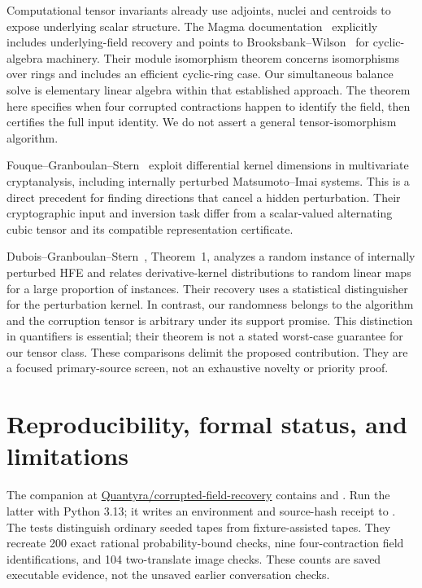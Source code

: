 \documentclass[11pt]{article}
\begin{document}
Computational tensor invariants already use adjoints, nuclei and centroids
to expose underlying scalar structure. The Magma documentation~\cite{magma}
explicitly includes underlying-field recovery and points to
Brooksbank--Wilson~\cite{bw} for cyclic-algebra machinery. Their module
isomorphism theorem concerns isomorphisms over rings and includes an efficient
cyclic-ring case. Our simultaneous balance solve is elementary linear algebra
within that established approach. The theorem here specifies when four
corrupted contractions happen to identify the field, then certifies the full
input identity. We do not assert a general tensor-isomorphism algorithm.

Fouque--Granboulan--Stern~\cite{fgs} exploit differential kernel dimensions
in multivariate cryptanalysis, including internally perturbed
Matsumoto--Imai systems. This is a direct precedent for finding directions
that cancel a hidden perturbation. Their cryptographic input and inversion
task differ from a scalar-valued alternating cubic tensor and its compatible
representation certificate.

Dubois--Granboulan--Stern~\cite{dgs}, Theorem~1, analyzes a random instance
of internally perturbed HFE and relates derivative-kernel distributions to
random linear maps for a large proportion of instances. Their recovery
uses a statistical distinguisher for the perturbation kernel. In contrast,
our randomness belongs to the algorithm and the corruption tensor is
arbitrary under its support promise. This distinction in quantifiers is
essential; their theorem is not a stated worst-case guarantee for our tensor
class. These comparisons delimit the proposed contribution. They are a
focused primary-source screen, not an exhaustive novelty or priority proof.

\section{Reproducibility, formal status, and limitations}
The companion at
\href{https://github.com/Quantyra/corrupted-field-recovery}{Quantyra/corrupted-field-recovery}
contains  and .
Run the latter with Python 3.13; it writes an environment and source-hash
receipt to . The tests distinguish
ordinary seeded tapes from fixture-assisted tapes. They recreate 200 exact
rational probability-bound checks, nine four-contraction field identifications,
and 104 two-translate image checks. These counts are saved executable
evidence, not the unsaved earlier conversation checks.
\end{document}

